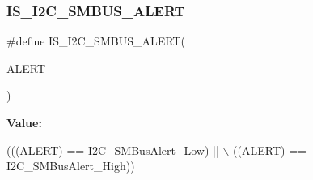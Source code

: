 \subsubsection{\texorpdfstring{I\+S\+\_\+\+I2\+C\+\_\+\+S\+M\+B\+U\+S\+\_\+\+A\+L\+E\+RT}{IS\_I2C\_SMBUS\_ALERT}}
{\footnotesize\ttfamily \#define I\+S\+\_\+\+I2\+C\+\_\+\+S\+M\+B\+U\+S\+\_\+\+A\+L\+E\+RT(\begin{DoxyParamCaption}\item[{}]{A\+L\+E\+RT }\end{DoxyParamCaption})}

{\bfseries Value\+:}
\begin{DoxyCode}
(((ALERT) == I2C\_SMBusAlert\_Low) || \(\backslash\)
                                   ((ALERT) == I2C\_SMBusAlert\_High))
\end{DoxyCode}
